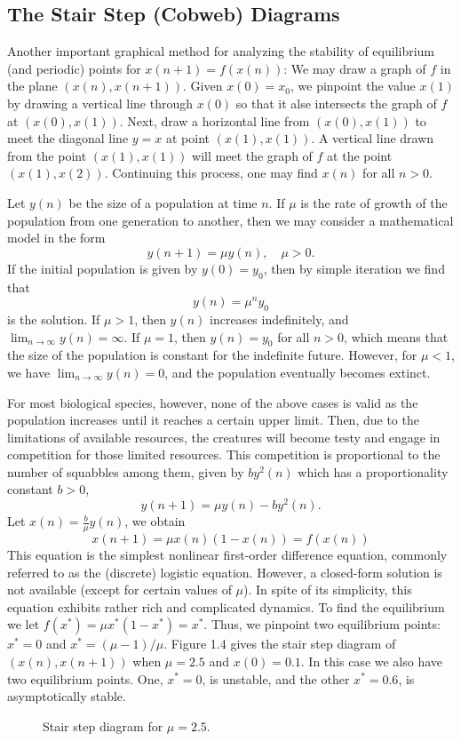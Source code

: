 \subsection{The Stair Step (Cobweb) Diagrams}

Another important graphical method for analyzing the stability of equilibrium (and periodic) points for $x(n+1)=f(x(n))$: We may draw a graph of $f$ in the plane $(x(n),x(n+1))$. Given $x(0)=x_0$, we pinpoint the value $x(1)$ by drawing a vertical line through $x(0)$ so that it alse intersects the graph of $f$ at $(x(0),x(1))$. Next, draw a horizontal line from $(x(0),x(1))$ to meet the diagonal line $y=x$ at point $(x(1),x(1))$. A vertical line drawn from the point $(x(1),x(1))$ will meet the graph of $f$ at the point $(x(1),x(2))$. Continuing this process, one may find $x(n)$ for all $n>0$.

\begin{eg}
    Let $y(n)$ be the size of a population at time $n$. If $\mu$ is the rate of growth of the population from one generation to another, then we may consider a mathematical model in the form
    \[
        y(n+1)=\mu y(n),\quad\mu>0.
    \]
    If the initial population is given by $y(0)=y_0$, then by simple iteration we find that
    \[
        y(n)=\mu^n y_0
    \]
    is the solution. If $\mu>1$, then $y(n)$ increases indefinitely, and $\lim_{n\to\infty}y(n)=\infty$. If $\mu=1$, then $y(n)=y_0$ for all $n>0$, which means that the size of the population is constant for the indefinite future. However, for $\mu<1$, we have $\lim_{n\to\infty}y(n)=0$, and the population eventually becomes extinct.

    For most biological species, however, none of the above cases is valid as the population increases until it reaches a certain upper limit. Then, due to the limitations of available resources, the creatures will become testy and engage in competition for those limited resources. This competition is proportional to the number of squabbles among them, given by $by^2(n)$ which has a proportionality constant $b>0$,
    \[
        y(n+1)=\mu y(n)-by^2(n).
    \]
    Let $x(n)=\frac{b}{\mu}y(n)$, we obtain
    \[
        x(n+1)=\mu x(n)(1-x(n))=f(x(n))
    \]
    This equation is the simplest nonlinear first-order difference equation, commonly referred to as the (discrete) logistic equation. However, a closed-form solution is not available (except for certain values of $\mu$). In spite of its simplicity, this equation exhibits rather rich and complicated dynamics. To find the equilibrium we let $f(x^*)=\mu x^*(1-x^*)=x^*$. Thus, we pinpoint two equilibrium points: $x^*=0$ and $x^*=(\mu-1)/\mu$.
    Figure 1.4 gives the stair step diagram of $(x(n),x(n+1))$ when $\mu=2.5$ and $x(0)=0.1$. In this case we also have two equilibrium points. One, $x^*=0$, is unstable, and the other $x^*=0.6$, is asymptotically stable.
\begin{figure}[H]
    \centering
    \caption{Stair step diagram for $\mu=2.5$.}
\end{figure}
\end{eg}

